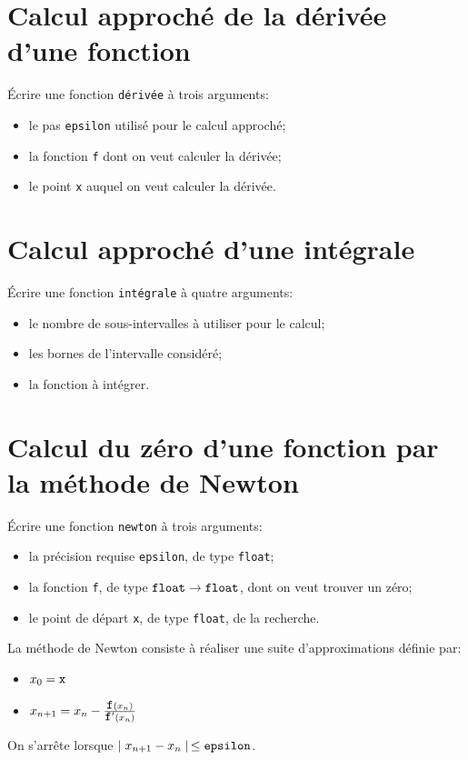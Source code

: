 
\section{Calcul approché de la dérivée d'une fonction}

Écrire une fonction {\tt dérivée} à trois arguments:
\begin{itemize}
\item le pas {\tt epsilon} utilisé pour le calcul approché;
\item la fonction {\tt f} dont on veut calculer la dérivée;
\item le point {\tt x} auquel on veut calculer la dérivée.
\end{itemize}

\section{Calcul approché d'une intégrale}

Écrire une fonction {\tt intégrale} à quatre arguments:
\begin{itemize}
\item le nombre de sous-intervalles à utiliser pour le calcul;
\item les bornes de l'intervalle considéré;
\item la fonction à intégrer.
\end{itemize}


\section{Calcul du zéro d'une fonction par la méthode de Newton}

Écrire une fonction {\tt newton} à trois arguments:
\begin{itemize}
\item la précision requise {\tt epsilon}, de type {\tt float};
\item la fonction {\tt f}, de type $\mbox{\tt float}\rightarrow\mbox{\tt float}$, dont on veut trouver un zéro;
\item le point de départ {\tt x}, de type {\tt float}, de la recherche.
\end{itemize}
La méthode de Newton consiste à réaliser une suite d'approximations définie par:
\begin{itemize}
\item $x_0 = \mbox{\tt x}$
\item $x_{n+1} = x_n - \frac{{\mbox{\tt f}}(x_n)}{{\mbox{\tt f}}'(x_n)}$
\end{itemize}
On s'arrête lorsque $\mid x_{n+1} - x_n \mid \,\leq \mbox{\tt epsilon}$.

